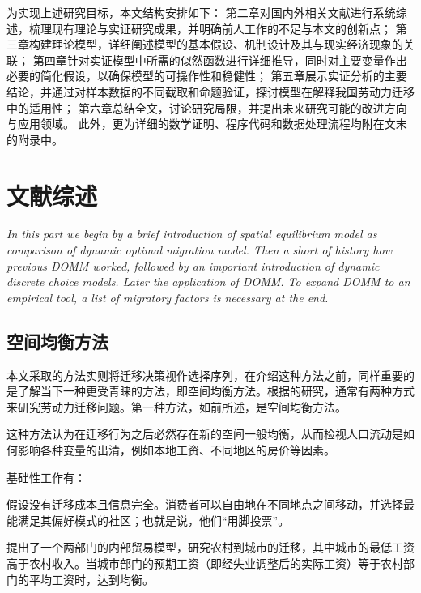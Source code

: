 \documentclass[a4paper,12pt,oneside]{book} %
\begin{document}
为实现上述研究目标，本文结构安排如下：  
第二章对国内外相关文献进行系统综述，梳理现有理论与实证研究成果，并明确前人工作的不足与本文的创新点；  
第三章构建理论模型，详细阐述模型的基本假设、机制设计及其与现实经济现象的关联；  
第四章针对实证模型中所需的似然函数进行详细推导，同时对主要变量作出必要的简化假设，以确保模型的可操作性和稳健性；  
第五章展示实证分析的主要结论，并通过对样本数据的不同截取和命题验证，探讨模型在解释我国劳动力迁移中的适用性；  
第六章总结全文，讨论研究局限，并提出未来研究可能的改进方向与应用领域。  
此外，更为详细的数学证明、程序代码和数据处理流程均附在文末的附录中。



\chapter{文献综述}

\begin{center}
  \textit{
    In this part we begin by a brief introduction of spatial equilibrium model as comparison of dynamic optimal migration model. Then a short of history how previous DOMM worked, followed by an important introduction of dynamic discrete choice models. Later the application of DOMM. To expand DOMM to an empirical tool, a list of migratory factors is necessary at the end.
  }
\end{center}


\section{空间均衡方法}
本文采取的方法实则将迁移决策视作选择序列，在介绍这种方法之前，同样重要的是了解当下一种更受青睐的方法，即空间均衡方法。根据\cite{jiaEconomicsInternalMigration2023}的研究，通常有两种方式来研究劳动力迁移问题。第一种方法，如前所述，是空间均衡方法。


这种方法认为在迁移行为之后必然存在新的空间一般均衡，从而检视人口流动是如何影响各种变量的出清，例如本地工资、不同地区的房价等因素。


基础性工作有：

\cite{tieboutPureTheoryLocal1956}假设没有迁移成本且信息完全。消费者可以自由地在不同地点之间移动，并选择最能满足其偏好模式的社区；也就是说，他们“用脚投票”。

\cite{harrisMigrationUnemploymentDevelopment1970}提出了一个两部门的内部贸易模型，研究农村到城市的迁移，其中城市的最低工资高于农村收入。当城市部门的预期工资（即经失业调整后的实际工资）等于农村部门的平均工资时，达到均衡。
\end{document}
